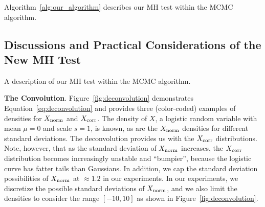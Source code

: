 \documentclass{article}
\begin{document}
Algorithm~\ref{alg:our_algorithm} describes our MH test within the MCMC algorithm.

\subsection{Discussions and Practical Considerations of the New MH Test}\label{ssec:discussion}

\begin{algorithm}[t]
\caption{A description of our MH test within the MCMC algorithm.}
\label{alg:our_algorithm}
\end{algorithm}

\textbf{The Convolution}. Figure~\ref{fig:deconvolution} demonstrates
Equation~\ref{eq:deconvolution} and provides three (color-coded) examples of densities for $X_{\rm
norm}$ and $X_{\rm corr}$. The density of $X$, a logistic random variable with mean $\mu = 0$ and
scale $s=1$, is known, as are the $X_{\rm norm}$ densities for different standard deviations. The
deconvolution provides us with the $X_{\rm corr}$ distributions. Note, however, that as the standard
deviation of $X_{\rm norm}$ increases, the $X_{\rm corr}$ distribution becomes increasingly unstable
and ``bumpier'', because the logistic curve has fatter tails than Gaussians. In addition, we cap
the standard deviation possibilities of $X_{\rm norm}$ at $\approx 1.2$ in our experiments. In our
experiments, we discretize the possible standard deviations of $X_{\rm norm}$, and we also limit the
densities to consider the range $[-10,10]$ as shown in Figure~\ref{fig:deconvolution}.
\end{document}
